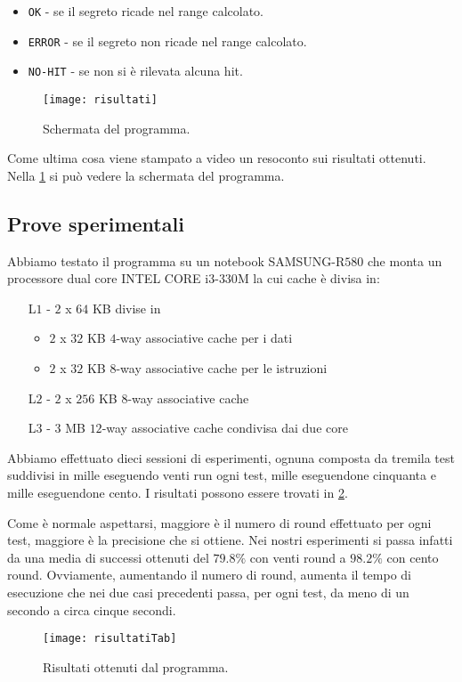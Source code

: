 				\begin{itemize}
					\item \texttt{OK} - se il segreto ricade nel range calcolato.
					\item \texttt{ERROR} - se il segreto non ricade nel range calcolato.
					\item \texttt{NO-HIT} - se non si è rilevata alcuna hit.
				\end{itemize}
			
				\begin{figure}
					\begin{center}
						\texttt{[image: risultati]}
						\caption[Schermata di SPARK]{Schermata del programma.}
						\label{fig:schermata}
					\end{center}
				\end{figure}
				
				Come ultima cosa viene stampato a video un resoconto sui risultati ottenuti. Nella \cref{fig:schermata} si può vedere la schermata del programma.
			
			\subsection{Prove sperimentali}
				Abbiamo testato il programma su un notebook SAMSUNG-R$580$ che monta un processore dual core INTEL CORE i$3$-$330$M la cui cache è divisa in:
				\begin{itemize}
					\item [L$1$ -] $2$ x $64$ KB divise in 
					\begin{itemize}
						\item  $2$ x $32$ KB $4$-way associative cache per i dati
						\item  $2$ x $32$ KB $8$-way associative cache per le istruzioni
					\end{itemize}
					\item[L$2$ -] $2$ x $256$ KB $8$-way associative cache
					\item[L$3$ -] $3$ MB $12$-way associative cache condivisa dai due core
				\end{itemize}
			
				Abbiamo effettuato dieci sessioni di esperimenti, ognuna composta da tremila test suddivisi in mille eseguendo venti run ogni test, mille eseguendone cinquanta e mille eseguendone cento. I risultati possono essere trovati in \cref{fig:risultati}.
				
				Come è normale aspettarsi, maggiore è il numero di round effettuato per ogni test, maggiore è la precisione che si ottiene. Nei nostri esperimenti si passa infatti da una media di successi ottenuti del $79.8\%$ con venti round a $98.2\%$ con cento round. Ovviamente, aumentando il numero di round, aumenta il tempo di esecuzione che nei due casi precedenti passa, per ogni test, da meno di un secondo a circa cinque secondi.
			
				\begin{figure}
					\begin{center}
						\texttt{[image: risultatiTab]}
						\caption[Risultati SPARK]{Risultati ottenuti dal programma.}
						\label{fig:risultati}
					\end{center}
				\end{figure}
					